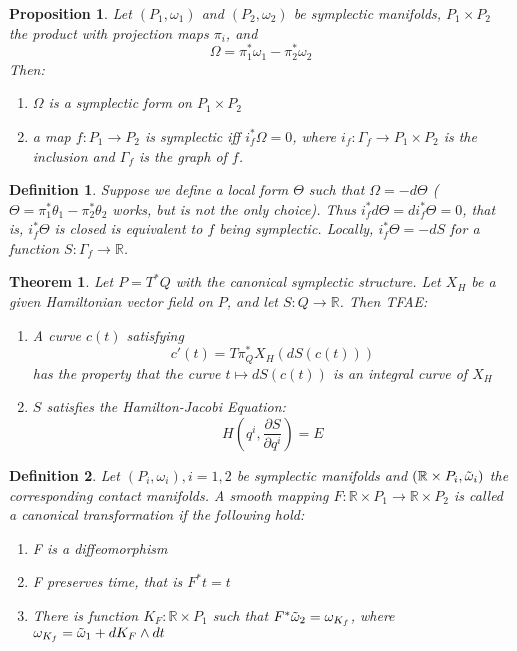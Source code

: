 \documentclass{article}
\newtheorem{thm}{Theorem}
\newtheorem{defn}{Definition}
\newtheorem{prop}{Proposition}
\begin{document}
\begin{prop}

Let $(P_1, \omega_1)$ and $(P_2, \omega_2)$ be symplectic manifolds, $P_1 \times P_2$ the product with projection maps $\pi_i$, and 
\[\Omega = \pi_1^* \omega_1 - \pi_2^* \omega_2\]
Then:
\begin{enumerate}
    \item $\Omega$ is a symplectic form on $P_1 \times P_2$
    \item a map $f: P_1 \to P_2$ is symplectic iff $i_f^* \Omega = 0$, where $i_f: \Gamma_f \to P_1 \times P_2$ is the inclusion and $\Gamma_f$ is the graph of $f$.
\end{enumerate}
\end{prop}

\begin{defn}
Suppose we define a local form $\Theta$ such that $\Omega = - d \Theta$ ($\Theta = \pi_1^* \theta_1 - \pi_2^*\theta_2$ works, but is not the only choice). Thus $i_f^* d\Theta = d i_f^* \Theta = 0$, that is, $i_f^*\Theta$ is closed is equivalent to $f$ being symplectic. Locally, $i_f^*\Theta = - dS$ for a function $S: \Gamma_f \to \mathbb{R}$.
\end{defn}

\begin{thm}

Let $P=T^*Q$ with the canonical symplectic structure. Let $X_H$ be a given Hamiltonian vector field on $P$, and let $S: Q \to \mathbb{R}$. Then TFAE:
\begin{enumerate}
    \item A curve $c(t)$ satisfying
    \[c'(t) = T \pi_Q^* X_H \left( dS(c(t)) \right)\]
    has the property that the curve $t \mapsto dS(c(t))$ is an integral curve of $X_H$
    \item $S$ satisfies the Hamilton-Jacobi Equation:
    \[H \left( q^i, \frac{\partial S}{\partial q^i} \right) = E    \]
\end{enumerate}
\end{thm}

\begin{defn}

Let $(P_i, \omega_i), i=1,2$ be symplectic manifolds and $(\mathbb{R} \times P_i, \Tilde{\omega}_i)$ the corresponding contact manifolds. A smooth mapping $F: \mathbb{R} \times P_1 \to \mathbb{R}\times P_2$ is called a canonical transformation if the following hold:

\begin{enumerate}
    \item[C1] F is a diffeomorphism
    \item[C2] F preserves time, that is $F^*t=t$
    \item[C3] There is function $K_F: \mathbb{R} \times P_1$ such that $F^* \Tilde{\omega}_2 = \omega_{K_f}$, where $\omega_{K_f} = \Tilde{\omega}_1 + dK_F \wedge dt$
\end{enumerate}
\end{defn}
\end{document}

